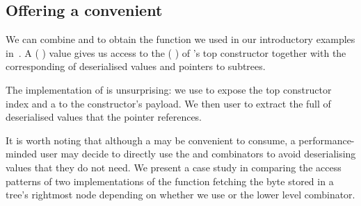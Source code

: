 \subsection{Offering a convenient }

We can combine  and  to obtain
the  function we used in our introductory examples
in~.
%
A (  ) value gives us
access to the ( ) of
's top constructor together with the corresponding
 of deserialised values and pointers to subtrees.


The implementation of  is unsurprising: we use
 to expose the top constructor index and a
 to the constructor's payload.
%
We then user  to extract the full
 of deserialised values that the
pointer references.


It is worth noting that although a  may be
convenient to consume, a performance-minded user may decide to
directly use the  and 
combinators to avoid deserialising values that they do not need.
%
We present a case study in  comparing the
access patterns of two implementations of the function fetching the
byte stored in a tree's rightmost node depending on whether we use
 or the lower level  combinator.
